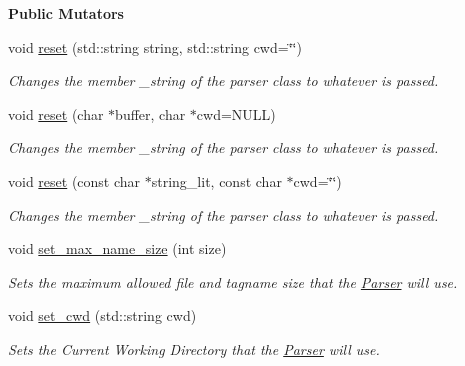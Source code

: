 \begin{Indent}\textbf{ Public Mutators}\par
\begin{DoxyCompactItemize}
\item 
void \mbox{\hyperlink{classParser_a87f5e73ca10ef5f84f37a4b37e0e6f59}{reset}} (std\+::string string, std\+::string cwd=\char`\"{}\char`\"{})
\begin{DoxyCompactList}\small\item\em Changes the member \+\_\+string of the parser class to whatever is passed. \end{DoxyCompactList}\item 
void \mbox{\hyperlink{classParser_a5e097c301e171481e8d2af91c112e35e}{reset}} (char $\ast$buffer, char $\ast$cwd=N\+U\+LL)
\begin{DoxyCompactList}\small\item\em Changes the member \+\_\+string of the parser class to whatever is passed. \end{DoxyCompactList}\item 
void \mbox{\hyperlink{classParser_ab51b81b1617f1948205d73804e3c0fb9}{reset}} (const char $\ast$string\+\_\+lit, const char $\ast$cwd=\char`\"{}\char`\"{})
\begin{DoxyCompactList}\small\item\em Changes the member \+\_\+string of the parser class to whatever is passed. \end{DoxyCompactList}\item 
void \mbox{\hyperlink{classParser_ac9c3bf43a7f27f92ecf538b83c5984d6}{set\+\_\+max\+\_\+name\+\_\+size}} (int size)
\begin{DoxyCompactList}\small\item\em Sets the maximum allowed file and tagname size that the \mbox{\hyperlink{classParser}{Parser}} will use. \end{DoxyCompactList}\item 
void \mbox{\hyperlink{classParser_a086f1431a0cac193fb6ff4506ba5c701}{set\+\_\+cwd}} (std\+::string cwd)
\begin{DoxyCompactList}\small\item\em Sets the Current Working Directory that the \mbox{\hyperlink{classParser}{Parser}} will use. \end{DoxyCompactList}\end{DoxyCompactItemize}
\end{Indent}
